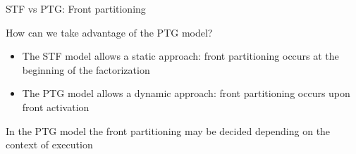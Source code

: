 \documentclass{beamer}
\newcommand{\db}[1]{\textcolor{amblu}{#1}}
\begin{document}
\begin{frame}{STF vs PTG: Front partitioning}

  How can we take advantage of the PTG model?

  \begin{itemize}
  \item The \db{STF} model allows a \alert{static approach}: front partitioning
    occurs at the beginning of the factorization
  \item The \db{PTG} model allows a \alert{dynamic approach}: front partitioning
    occurs upon front activation
  \end{itemize}

  In the \db{PTG} model the front partitioning may be decided depending on
  the \alert{context of execution}

  


  
\end{frame}
\end{document}

